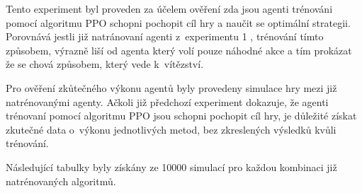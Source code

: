 Tento experiment byl proveden za účelem ověření zda jsou agenti trénováni pomocí algoritmu PPO schopni pochopit cíl hry a naučit se optimální strategii.
Porovnává jestli již natránovaní agenti z~experimentu 1 , trénování tímto způsobem, výrazně liší od agenta který volí pouze náhodné akce a tím prokázat že se chová způsobem, který vede k~vítězství.

Pro ověření zkůtečného výkonu agentů byly provedeny simulace hry mezi již natrénovanými agenty.
Ačkoli již předchozí experiment dokazuje, že agenti trénovaní pomocí algoritmu PPO jsou schopni pochopit cíl hry, je důležité získat zkutečné data o~výkonu jednotlivých metod, bez zkreslených výsledků kvůli trénování.

Následující tabulky byly získány ze 10000 simulací pro každou kombinaci již natrénovaných algoritmů.

